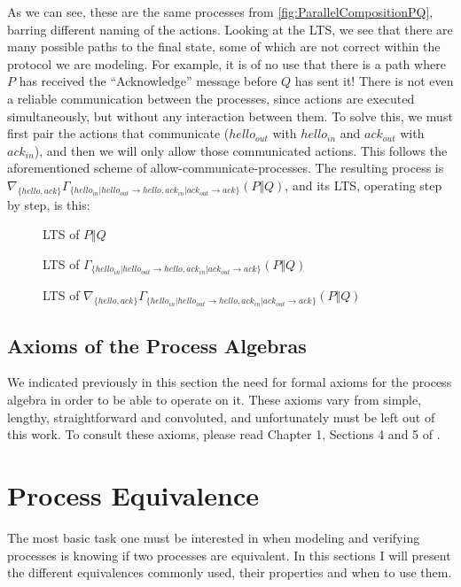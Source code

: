 \documentclass[11pt]{article}
\theoremstyle{definition}
\theoremstyle{plain}
\theoremstyle{definition}
\begin{document}
As we can see, these are the same processes from \ref{fig:ParallelCompositionPQ}, barring different naming of the actions. Looking at the LTS, we see that there are many possible paths to the final state, some of which are not correct within the protocol we are modeling. For example, it is of no use that there is a path where $ P $ has received the ``Acknowledge'' message before $ Q $ has sent it! There is not even a reliable communication between the processes, since actions are executed simultaneously, but without any interaction between them. To solve this, we must first pair the actions that communicate ($ hello_{out} $ with $ hello_{in} $ and $ ack_{out} $ with $ ack_{in} $), and then we will only allow those communicated actions. This follows the aforementioned scheme of allow-communicate-processes. The resulting process is $ \nabla_{\{hello, ack\}}\Gamma_{\{hello_{in} | hello_{out} \rightarrow hello, ack_{in} | ack_{out} \rightarrow ack\}}(P \Vert Q) $, and its LTS, operating step by step, is this:

\begin{figure} [H]
	\centering
	
	\caption{LTS of $ P \Vert Q $} \label{fig:CommunicationOperatorProcess}
	\endminipage\hfill
	\centering
	
	\caption{LTS of $\Gamma_{\{hello_{in} | hello_{out} \rightarrow hello, ack_{in} | ack_{out} \rightarrow ack\}}(P \Vert Q) $} \label{fig:CommunicationOperatorCommunicate}
	\endminipage\hfill
	\centering
	
	\caption{LTS of $ \nabla_{\{hello, ack\}}\Gamma_{\{hello_{in} | hello_{out} \rightarrow hello, ack_{in} | ack_{out} \rightarrow ack\}}(P \Vert Q) $} \label{fig:CommunicationOperatorAllow}
	\endminipage\hfill
\end{figure}

\subsection{Axioms of the Process Algebras}

We indicated previously in this section the need for formal axioms for the process algebra in order to be able to operate on it. These axioms vary from simple, lengthy, straightforward and convoluted, and unfortunately must be left out of this work. To consult these axioms, please read Chapter 1, Sections 4 and 5 of \cite{Groote:2014:MAC:2628007}.

\section{Process Equivalence}
The most basic task one must be interested in when modeling and verifying processes is knowing if two processes are equivalent. In this sections I will present the different equivalences commonly used, their properties and when to use them.
\end{document}
